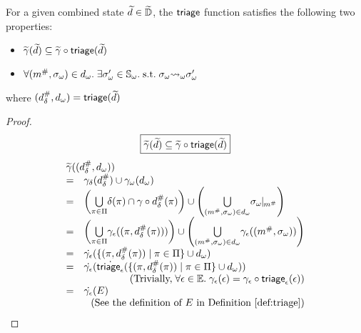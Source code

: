 \begin{lemma}\label{lemma:triage}
  For a given combined state $\widetilde{d} \in \widetilde{\mathbb{D}}$, the $\textsf{triage}$ function
  satisfies the following two properties:
  \begin{itemize}
    \item $\widetilde{\gamma}(\widetilde{d}) \subseteq \widetilde{\gamma} \circ \textsf{triage}(\widetilde{d})$
    \item $\forall ({m}^{\#}, {\sigma}_\omega) \in {d}_\omega. \; \exists {\sigma}_\omega' \in
      {\mathbb{S}}_\omega.  \; \text{s.t.} \; {\sigma}_\omega {\leadsto}_\omega {\sigma}_\omega'$
  \end{itemize}
  where $({{d}^{\#}_\delta}, {d}_\omega) = \textsf{triage}(\widetilde{d})$
\end{lemma}
\begin{proof}
  \[
    \fbox{$\widetilde{\gamma}(\widetilde{d}) \subseteq \widetilde{\gamma} \circ \textsf{triage}(\widetilde{d})$}
  \]
  \[
    \begin{array}{cl}
      \multicolumn{2}{l}{\combgamma((\sabselem, \symbelem))}\\
      =& \sgamma(\sabselem) \cup \symbgamma(\symbelem)\\

      =& \left( \underset{\view \in \viewset}{\bigcup} {\viewmap(\view) \cap
      \gamma \circ \sabselem(\view)} \right) \cup \left( \underset{(\absimap,
      \symbst) \in \symbelem}{\bigcup} \instant{\symbst}{\absimap} \right) \\

      =& \left( \underset{\view \in \viewset}{\bigcup} \aelemgamma((\view,
      \sabselem(\view))) \right) \cup \left( \underset{(\absimap, \symbst) \in
      \symbelem}{\bigcup} \aelemgamma((\absimap, \symbst)) \right) \\

      =& \dot\aelemgamma(\{ (\view, \sabselem(\view)) \mid \view \in \viewset \}
      \cup \symbelem)\\

      =& \dot\aelemgamma(\dot{\atriage}(\{ (\view, \sabselem(\view)) \mid \view
      \in \viewset \} \cup \symbelem))\\

       & \multicolumn{1}{r}{(\text{Trivially,} \; \forall \aelem \in \aelemset.
       \; \aelemgamma(\aelem) = \aelemgamma \circ \atriage(\aelem))}\\

      =& \dot\aelemgamma(E)\\
       & \multicolumn{1}{r}{(\text{See the definition of $E$ in
       Definition~\ref{def:triage}})}\\


\end{array}\]
\end{proof}
